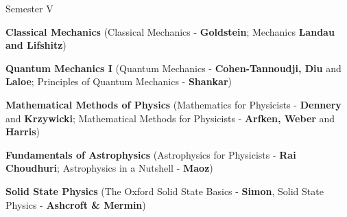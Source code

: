 \begin{cventries}
  \cventry
    {Semester V} %
    {} %
    {} %
    {} %
    {
      \begin{cvitems} %
        \item {\textbf{Classical Mechanics} (Classical Mechanics - \textbf{Goldstein}; Mechanics \textbf{Landau and Lifshitz}) }
        \item {\textbf{Quantum Mechanics I} (Quantum Mechanics - \textbf{Cohen-Tannoudji, Diu} and \textbf{Laloe}; Principles of Quantum Mechanics - \textbf{Shankar}) }
        \item {\textbf{Mathematical Methods of Physics} (Mathematics for Physicists - \textbf{Dennery} and \textbf{Krzywicki}; Mathematical Methods for Physicists - \textbf{Arfken, Weber} and \textbf{Harris})}
    	\item {\textbf{Fundamentals of Astrophysics} (Astrophysics for Physicists - \textbf{Rai Choudhuri}; Astrophysics in a Nutshell - \textbf{Maoz})}
    	\item {\textbf{Solid State Physics} (The Oxford Solid State Basics - \textbf{Simon}, Solid State Physics - \textbf{Ashcroft \& Mermin})}
      \end{cvitems}
    }

\end{cventries}
